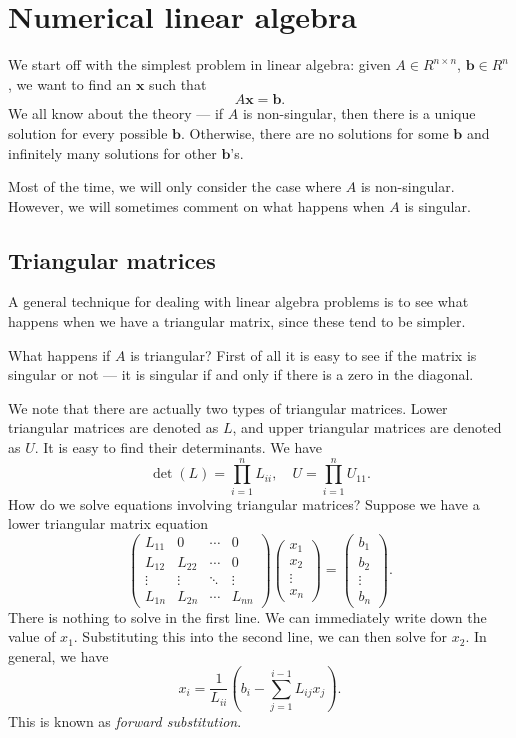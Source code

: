 \documentclass[a4paper]{article}
\begin{document}
\section{Numerical linear algebra}
We start off with the simplest problem in linear algebra: given $A \in R^{n \times n}$, $\mathbf{b} \in R^n$, we want to find an $\mathbf{x}$ such that
\[
  A\mathbf{x} = \mathbf{b}.
\]
We all know about the theory --- if $A$ is non-singular, then there is a unique solution for every possible $\mathbf{b}$. Otherwise, there are no solutions for some $\mathbf{b}$ and infinitely many solutions for other $\mathbf{b}$'s.

Most of the time, we will only consider the case where $A$ is non-singular. However, we will sometimes comment on what happens when $A$ is singular.

\subsection{Triangular matrices}
A general technique for dealing with linear algebra problems is to see what happens when we have a triangular matrix, since these tend to be simpler.

What happens if $A$ is triangular? First of all it is easy to see if the matrix is singular or not --- it is singular if and only if there is a zero in the diagonal.

We note that there are actually two types of triangular matrices. Lower triangular matrices are denoted as $L$, and upper triangular matrices are denoted as $U$. It is easy to find their determinants. We have
\[
  \det(L) = \prod_{i = 1}^n L_{ii},\quad U = \prod_{i = 1}^n U_{11}.
\]
How do we solve equations involving triangular matrices? Suppose we have a lower triangular matrix equation
\[
  \begin{pmatrix}
    L_{11} & 0 & \cdots & 0\\
    L_{12} & L_{22} & \cdots & 0\\
    \vdots & \vdots & \ddots & \vdots\\
    L_{1n} & L_{2n} & \cdots & L_{nn}
  \end{pmatrix}
  \begin{pmatrix}
    x_1\\
    x_2\\
    \vdots\\
    x_n
  \end{pmatrix}
  =
  \begin{pmatrix}
    b_1\\
    b_2\\
    \vdots\\
    b_n
  \end{pmatrix}.
\]
There is nothing to solve in the first line. We can immediately write down the value of $x_1$. Substituting this into the second line, we can then solve for $x_2$. In general, we have
\[
  x_i = \frac{1}{L_{ii}} \left(b_i - \sum_{j = 1}^{i - 1} L_{ij} x_j\right).
\]
This is known as \emph{forward substitution}.
\end{document}
